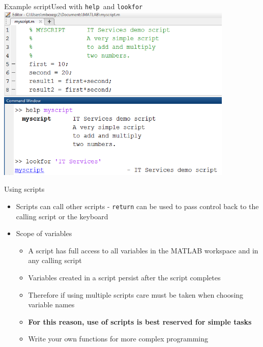 \documentclass{beamer}
\begin{document}
\begin{frame}{Example script}{Used with \texttt{help }and \texttt{lookfor}}
	\includegraphics[width=0.85\textwidth]{script_help_lookfor}
\end{frame}

\begin{frame}{Using scripts}
	\begin{itemize}
		\item Scripts can call other scripts - \texttt{return} can be used to pass control back to the calling script or the keyboard
		\item Scope of variables
		\begin{itemize}
			\item A script has full access to all variables in the MATLAB workspace and in any calling script
			\item Variables created in a script persist after the script completes
			\item Therefore if using multiple scripts care must be taken when choosing variable names
			\item \textbf{For this reason, use of scripts is best reserved for simple tasks}	
			\item Write your own functions for more complex programming
		\end{itemize}
	\end{itemize}
\end{frame}

\end{document}
